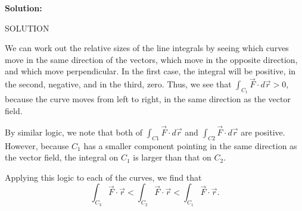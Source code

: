 \documentclass[10pt,]{book}
\theoremstyle{plain}
\theoremstyle{definition}
\theoremstyle{definition}
\theoremstyle{definition}
\theoremstyle{definition}
\theoremstyle{definition}
\numberwithin{equation}{section}
\begin{document}
\begin{exerciselist}
\begin{mdframed}
{\par \par {\bf Solution: }\par  SOLUTION \par 

We can work out the relative sizes of the line integrals by seeing
which curves move in the same direction of the vectors, which move
in the opposite direction, and which move perpendicular.  In the first
case, the integral will be positive, in the second, negative, and in
the third, zero.  Thus, we see that
\(\int_{C_1}\vec F\cdot d\vec r > 0\), because the curve moves from left to right, in the same direction as the vector field.

\par 
By similar logic, we note that both of \(\int_{C1}\vec F\cdot d\vec r\) and \(\int_{C2}\vec F\cdot d\vec r\) are positive.  However, because \(C_1\) has a smaller component pointing in the same direction as the vector field, the integral on \(C_1\) is larger than that on \(C_2\).\par 

Applying this logic to each of the curves, we find that
\[\int_{C_{3}}\vec F\cdot\vec r <
   \int_{C_{2}}\vec F\cdot\vec r <
   \int_{C_{1}}\vec F\cdot\vec r.\]


}
\end{mdframed}
\end{exerciselist}
\end{document}
